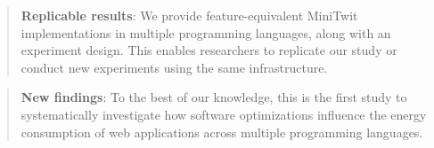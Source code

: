 \documentclass[../main.tex]{subfiles}
\begin{document}
\begin{quote}
    \textbf{Replicable results}: We provide feature-equivalent MiniTwit implementations in multiple programming languages, along with an experiment design. This enables researchers to replicate our study or conduct new experiments using the same infrastructure.
\end{quote}

\begin{quote}
    \textbf{New findings}: To the best of our knowledge, this is the first study to systematically investigate how software optimizations influence the energy consumption of web applications across multiple programming languages.
\end{quote}
\end{document}
